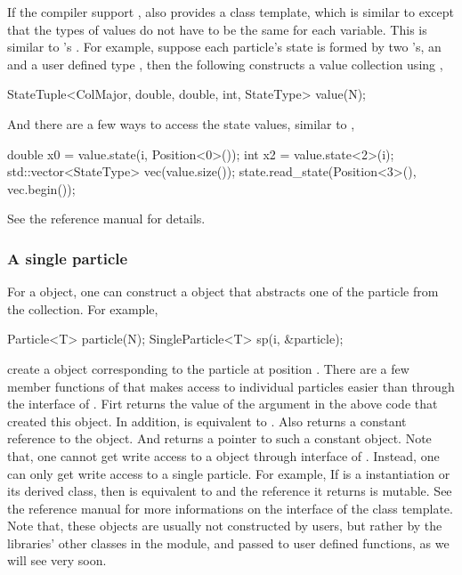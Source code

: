 If the compiler support \cppoo{} , \vsmc also provides a
 class template, which is similar to 
except that the types of values do not have to be the same for each variable.
This is similar to \rlang's . For example, suppose each
particle's state is formed by two 's, an  and a user
defined type , then the following constructs a value
collection using ,
\begin{cppcode}
StateTuple<ColMajor, double, double, int, StateType> value(N);
\end{cppcode}
And there are a few ways to access the state values, similar to
,
\begin{cppcode}
double x0 = value.state(i, Position<0>());
int x2 = value.state<2>(i);
std::vector<StateType> vec(value.size());
state.read_state(Position<3>(), vec.begin());
\end{cppcode}
See the reference manual for details.

\subsubsection{A single particle}
\label{ssub:A single particle}

For a  object, one can construct a 
object that abstracts one of the particle from the collection. For example,
\begin{cppcode}
Particle<T> particle(N);
SingleParticle<T> sp(i, &particle);
\end{cppcode}
create a  object corresponding to the particle at
position . There are a few member functions of
 that makes access to individual particles easier than
through the interface of . Firt  returns the
value of the argument  in the above code that created this
 object. In addition,  is equivalent to
. Also  returns a constant reference
to the  object. And  returns a
pointer to such a constant  object. Note that, one cannot
get write access to a  object through interface of
. Instead, one can only get write access to a single
particle. For example, If  is a  instantiation or
its derived class, then  is equivalent to
 and the reference it returns is mutable.
See the reference manual for more informations on the interface of the
 class template. Note that, these
 objects are usually not constructed by users, but
rather by the libraries' other classes in the \smp module, and passed to user
defined functions, as we will see very soon.

